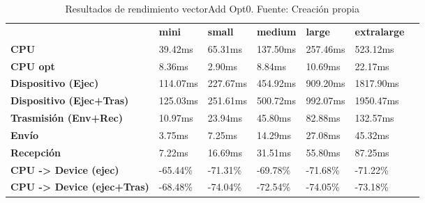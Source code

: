 \begin{table}[H]
    \centering
    \begin{tabular}{lllllll}
    \rowcolor[HTML]{DAE8FC} \ &  \textbf{mini} &  \textbf{small} &  \textbf{medium} &  \textbf{	large} &  \textbf{	extralarge} \\
    \cellcolor[HTML]{DAE8FC} \textbf{CPU} & 39.42ms & 65.31ms & 137.50ms & 	257.46ms & 	523.12ms \\
    \rowcolor[HTML]{EFEFEF} \cellcolor[HTML]{DAE8FC} \textbf{CPU opt} & 8.36ms & 2.90ms & 8.84ms & 	10.69ms & 	22.17ms \\
    \cellcolor[HTML]{DAE8FC} \textbf{Dispositivo (Ejec)} & 114.07ms & 227.67ms & 454.92ms & 	909.20ms & 	1817.90ms \\
    \rowcolor[HTML]{EFEFEF} \cellcolor[HTML]{DAE8FC} \textbf{Dispositivo (Ejec+Tras)} & 125.03ms & 251.61ms & 500.72ms & 	992.07ms & 	1950.47ms \\
    \cellcolor[HTML]{DAE8FC} \textbf{Trasmisión (Env+Rec)} & 10.97ms & 23.94ms & 45.80ms & 	82.88ms & 	132.57ms \\
    \rowcolor[HTML]{EFEFEF} \cellcolor[HTML]{DAE8FC} \textbf{Envío} & 3.75ms & 7.25ms & 14.29ms & 	27.08ms & 	45.32ms \\
    \cellcolor[HTML]{DAE8FC} \textbf{Recepción} & 7.22ms & 16.69ms & 31.51ms & 	55.80ms & 	87.25ms \\
    \rowcolor[HTML]{EFEFEF} \cellcolor[HTML]{DAE8FC} \textbf{CPU -> Device (ejec)} & -65.44\% & -71.31\% & -69.78\% & 	-71.68\% & 	-71.22\% \\
    \cellcolor[HTML]{DAE8FC} \textbf{CPU -> Device (ejec+Tras)} & -68.48\% & -74.04\% & -72.54\% & 	-74.05\% & 	-73.18\% \\
    \end{tabular}
    \caption[Resultados de rendimiento vectorAdd Opt0]{{Resultados de rendimiento vectorAdd Opt0. Fuente: Creación propia}}
    \label{table_test_vectorAdd_Opt0_hw_performanceResults}
\end{table}